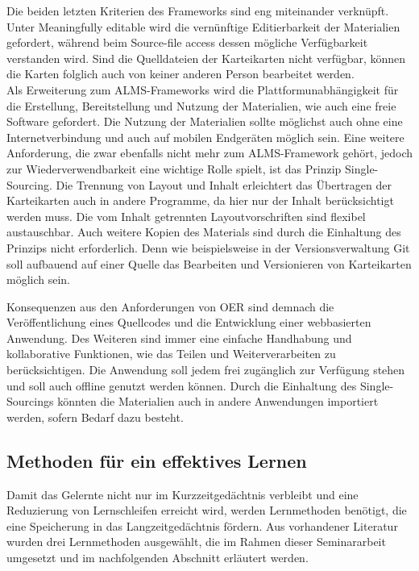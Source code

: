 Die beiden letzten Kriterien des Frameworks sind eng miteinander verknüpft. Unter \glqq Meaningfully editable \grqq{} wird die vernünftige Editierbarkeit der Materialien gefordert, während beim \glqq Source-file access \grqq{} dessen mögliche Verfügbarkeit verstanden wird. Sind die Quelldateien der Karteikarten nicht verfügbar, können die Karten folglich auch von keiner anderen Person bearbeitet werden. \\

Als Erweiterung zum ALMS-Frameworks wird die Plattformunabhängigkeit für die Erstellung, Bereitstellung und Nutzung der Materialien, wie auch eine freie Software gefordert. Die Nutzung der Materialien sollte möglichst auch ohne eine Internetverbindung und auch auf mobilen Endgeräten möglich sein. 
Eine weitere Anforderung, die zwar ebenfalls nicht mehr zum ALMS-Framework gehört, jedoch zur Wiederverwendbarkeit eine wichtige Rolle spielt, ist das Prinzip \glqq Single-Sourcing\grqq{}. Die Trennung von Layout und Inhalt erleichtert das Übertragen der Karteikarten auch in andere Programme, da hier nur der Inhalt berücksichtigt werden muss. Die vom Inhalt getrennten Layoutvorschriften sind flexibel austauschbar. Auch weitere Kopien des Materials sind durch die Einhaltung des Prinzips nicht erforderlich. Denn wie beispielsweise in der Versionsverwaltung Git soll aufbauend auf einer Quelle das Bearbeiten und Versionieren von Karteikarten möglich sein.


Konsequenzen aus den Anforderungen von OER sind demnach die Veröffentlichung eines Quellcodes und die Entwicklung einer webbasierten Anwendung. Des Weiteren sind immer eine einfache Handhabung und kollaborative Funktionen, wie das Teilen und Weiterverarbeiten zu berücksichtigen. Die Anwendung soll jedem frei zugänglich zur Verfügung stehen und soll auch offline genutzt werden können. Durch die Einhaltung des Single-Sourcings könnten die Materialien auch in andere Anwendungen importiert werden, sofern Bedarf dazu besteht.


\subsection{Methoden für ein effektives Lernen}
Damit das Gelernte nicht nur im Kurzzeitgedächtnis verbleibt und eine Reduzierung von Lernschleifen erreicht wird, werden Lernmethoden benötigt, die eine Speicherung in das Langzeitgedächtnis fördern. Aus vorhandener Literatur wurden drei Lernmethoden ausgewählt, die im Rahmen dieser Seminararbeit umgesetzt und im nachfolgenden Abschnitt erläutert werden.

